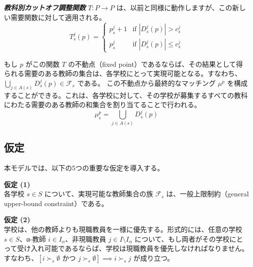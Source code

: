\documentclass[12pt, a4paper]{article}
\theoremstyle{definition}
\theoremstyle{remark}
\theoremstyle{plain}
\begin{document}
\textbf{\textit{教科別カットオフ調整関数}} $T : P \rightarrow P$ は、以前と同様に動作しますが、この新しい需要関数に対して適用される。
\[
T_s^j(p) =
\begin{cases}
p_s^j + 1 & \text{if } | D_s^j(p) | > c^j_s \\
p_s^j     & \text{if } | D_s^j(p) | \leq c^j_s
\end{cases}
\]

もし $p$ がこの関数 $T$ の不動点（fixed point）であるならば、その結果として得られる需要のある教師の集合は、各学校にとって実現可能となる。すなわち、$\bigcup_{j \in A(s)} D^j_s(p) \in \mathcal{F}_s$ である。
この不動点から最終的なマッチング $\mu^p$ を構成することができる。これは、各学校に対して、その学校が募集するすべての教科にわたる需要のある教師の和集合を割り当てることで行われる。
\[
\mu^{p}_s =\bigcup_{j \in A(s)} D^j_s(p)
\]



\subsection{仮定}
本モデルでは、以下の5つの重要な仮定を導入する。

\vspace{0.5\baselineskip} %
\noindent\textbf{仮定 (1)} \\
各学校 $s \in S$ について、実現可能な教師集合の族 $\mathcal{F}_s$ は、一般上限制約（general upper-bound constraint）である。

\vspace{0.5\baselineskip}
\noindent\textbf{仮定 (2)} \\
学校は、他の教師よりも現職教員を一様に優先する。形式的には、任意の学校 $s \in S$、α-教師 $i \in I_\alpha$、非現職教員 $j \in I\setminus I_\alpha$ について、もし両者がその学校にとって受け入れ可能であるならば、学校は現職教員を優先しなければなりません。すなわち、$[i \succ_s \emptyset \text{ かつ } j \succ_s \emptyset] \implies i \succ_s j$ が成り立つ。

\vspace{0.5\baselineskip}
\end{document}
